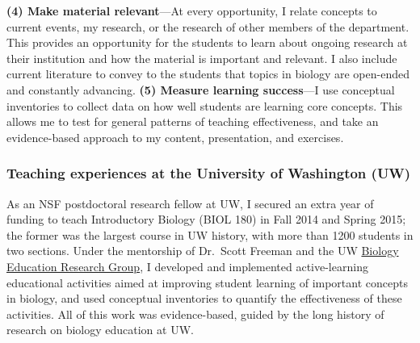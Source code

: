 \textbf{(4) Make material relevant}---At every opportunity, I relate concepts
to current events, my research, or the research of other members of the
department.
This provides an opportunity for the students to learn about ongoing
research at their institution and how the material is important and relevant.
I also include current literature to convey to the students that topics in
biology are open-ended and constantly advancing.
\textbf{(5) Measure learning success}---I use conceptual inventories to
collect
data on how well students are learning core concepts.
This allows me to test for general patterns of teaching effectiveness, and take
an evidence-based approach to my content, presentation, and exercises.

\subsubsection*{Teaching experiences at the University of Washington (UW)}
As an NSF postdoctoral research fellow at UW,
I secured an extra year of funding to teach
Introductory Biology
(BIOL 180) in Fall 2014 and Spring 2015;
the former was the largest course in UW history, with more than 1200 students
in two sections.
Under the mentorship of Dr.\ Scott Freeman and the UW
\href{https://sites.google.com/site/uwbioedresgroup/home}{Biology Education
    Research Group}, I developed and implemented active-learning
educational activities aimed at improving student learning of important
concepts in biology,
and used conceptual inventories to quantify the effectiveness of these
activities.
All of this work was evidence-based, guided by the long history of research on
biology education at UW.

